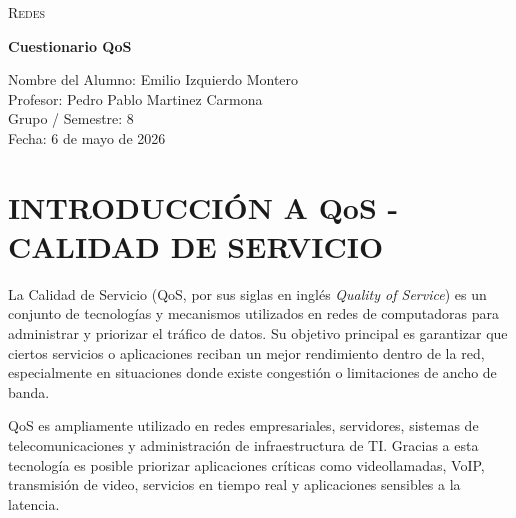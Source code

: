 \documentclass[12pt]{article}
\begin{document}
\begin{titlepage}
    \centering


    {\scshape\Large Redes \par}
    \vspace{1.5cm}

    {\huge\bfseries Cuestionario QoS \par}
    \vspace{0.5cm}

    \vfill

    {\large
    Nombre del Alumno: Emilio Izquierdo Montero {\hspace{6cm}} \\
    \vspace{0.3cm}
    Profesor: Pedro Pablo Martinez Carmona {\hspace{6cm}} \\
    \vspace{0.3cm}
    Grupo / Semestre: 8 {\hspace{6cm}} \\
    \vspace{0.3cm}
    Fecha: 6 de mayo de 2026 {\hspace{6cm}}
    \par}

    \vfill

\end{titlepage}

\section*{INTRODUCCIÓN A QoS - CALIDAD DE SERVICIO}

La Calidad de Servicio (QoS, por sus siglas en inglés \textit{Quality of Service}) es un conjunto de tecnologías y mecanismos utilizados en redes de computadoras para administrar y priorizar el tráfico de datos. Su objetivo principal es garantizar que ciertos servicios o aplicaciones reciban un mejor rendimiento dentro de la red, especialmente en situaciones donde existe congestión o limitaciones de ancho de banda.

QoS es ampliamente utilizado en redes empresariales, servidores, sistemas de telecomunicaciones y administración de infraestructura de TI. Gracias a esta tecnología es posible priorizar aplicaciones críticas como videollamadas, VoIP, transmisión de video, servicios en tiempo real y aplicaciones sensibles a la latencia.
\end{document}
